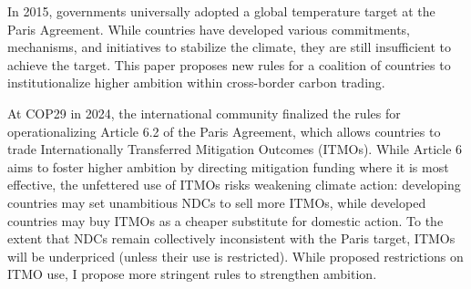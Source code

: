 \documentclass[12pt,english]{article}
\begin{document}

In 2015, governments universally adopted a global temperature target at the Paris Agreement. While countries have developed various commitments, mechanisms, and initiatives to stabilize the climate, they are still insufficient to achieve the target. This paper proposes new rules for a coalition of countries to institutionalize higher ambition within cross-border carbon trading.

At COP29 in 2024, the international community finalized the rules for operationalizing Article 6.2 of the Paris Agreement, which allows countries to trade Internationally Transferred Mitigation Outcomes (ITMOs). While Article 6 aims to foster higher ambition by directing mitigation funding where it is most effective, the unfettered use of ITMOs risks weakening climate action: developing countries may set unambitious NDCs to sell more ITMOs, while developed countries may buy ITMOs as a cheaper substitute for domestic action. To the extent that NDCs remain collectively inconsistent with the Paris target, ITMOs will be underpriced (unless their use is restricted). While \cite{michaelowa_additionality_2019} proposed restrictions on ITMO use, I propose more stringent rules to strengthen ambition.
\end{document}
